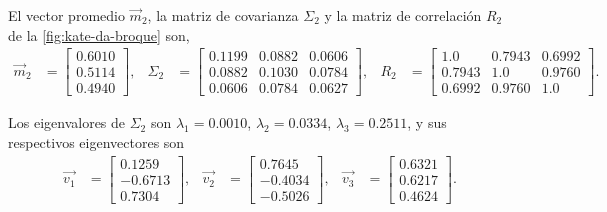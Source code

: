 El vector promedio $\vec{m}_2$, la matriz de covarianza $\Sigma_2$ y la matriz de correlación $R_2$ de la \cref{fig:kate-da-broque} son,
\begin{align*}
    \vec{m}_2 & =
    \begin{bmatrix}
        0.6010 \\
        0.5114 \\
        0.4940
    \end{bmatrix}, &
    \Sigma_2 & =
    \begin{bmatrix}
        0.1199 & 0.0882 & 0.0606 \\
        0.0882 & 0.1030 & 0.0784 \\
        0.0606 & 0.0784 & 0.0627
    \end{bmatrix}, &
    R_2 & = 
    \begin{bmatrix}
        1.0    & 0.7943 & 0.6992 \\
        0.7943 & 1.0    & 0.9760 \\
        0.6992 & 0.9760 & 1.0
    \end{bmatrix}.
\end{align*}

Los eigenvalores de $\Sigma_2$ son $\lambda_1 = 0.0010$, $\lambda_2 = 0.0334$, $\lambda_3 = 0.2511$, y sus respectivos eigenvectores son
\begin{align*}
    \vec{v_1} & =
    \begin{bmatrix}
        0.1259 \\
        -0.6713 \\
        0.7304
    \end{bmatrix}, &
    \vec{v_2} & = 
    \begin{bmatrix}
        0.7645 \\
        -0.4034 \\
        -0.5026
    \end{bmatrix}, &
    \vec{v_3} & =
    \begin{bmatrix}
        0.6321 \\
        0.6217 \\
        0.4624
    \end{bmatrix}.
\end{align*}

